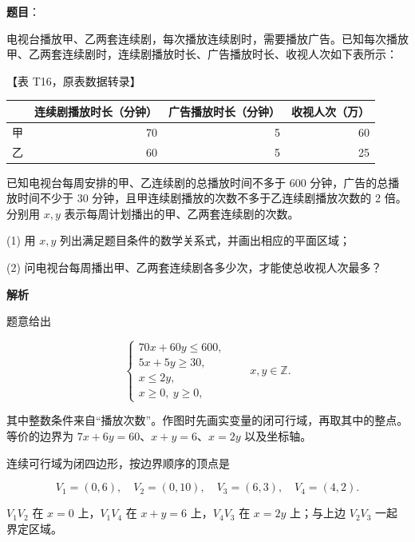 \begin{answer}

\textbf{题目}：

电视台播放甲、乙两套连续剧，每次播放连续剧时，需要播放广告。已知每次播放甲、乙两套连续剧时，连续剧播放时长、广告播放时长、收视人次如下表所示：

【表 T16，原表数据转录】

\begin{center}
\begin{tabular}{lrrr}
\toprule
 & 连续剧播放时长（分钟） & 广告播放时长（分钟） & 收视人次（万） \\
\midrule
甲 & 70 & 5 & 60 \\
乙 & 60 & 5 & 25 \\
\bottomrule
\end{tabular}
\end{center}

已知电视台每周安排的甲、乙连续剧的总播放时间不多于 600 分钟，广告的总播放时间不少于 30 分钟，且甲连续剧播放的次数不多于乙连续剧播放次数的 2 倍。分别用 $x,y$ 表示每周计划播出的甲、乙两套连续剧的次数。

(1)   用 $x,y$ 列出满足题目条件的数学关系式，并画出相应的平面区域；

(2)   问电视台每周播出甲、乙两套连续剧各多少次，才能使总收视人次最多？

\textbf{解析}


题意给出

\nopagebreak[4]
\[\begin{cases}70x+60y\leqslant600,\\5x+5y\geqslant30,\\x\leqslant2y,\\x\geqslant0,\ y\geqslant0,\end{cases}\qquad x,y\in\mathbb Z.\]

其中整数条件来自“播放次数”。作图时先画实变量的闭可行域，再取其中的整点。等价的边界为 $7x+6y=60$、$x+y=6$、$x=2y$ 以及坐标轴。

连续可行域为闭四边形，按边界顺序的顶点是

\nopagebreak[4]
\[V_1=(0,6),\quad V_2=(0,10),\quad V_3=(6,3),\quad V_4=(4,2).\]

$V_1V_2$ 在 $x=0$ 上，$V_1V_4$ 在 $x+y=6$ 上，$V_4V_3$ 在 $x=2y$ 上；与上边 $V_2V_3$ 一起界定区域。



\end{answer}
